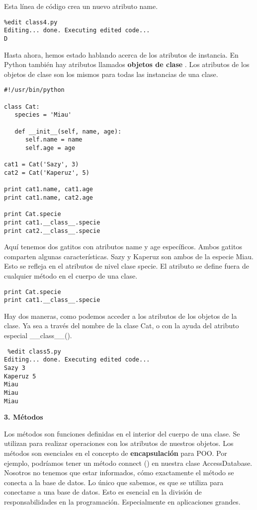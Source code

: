 \documentclass[twoside,10.5pt]{article}%
\begin{document}
Esta l\'inea de c\'odigo crea un nuevo atributo name.

\begin{verbatim}
%edit class4.py
Editing... done. Executing edited code...
D
\end{verbatim}


Hasta ahora, hemos estado hablando acerca de los atributos de instancia. En Python tambi\'en hay atributos llamados \textbf{objetos de clase} . Los atributos de los objetos de clase son los mismos para todas las instancias de una clase.

\vspace{0.3cm}

\begin{verbatim}
#!/usr/bin/python

class Cat:
   species = 'Miau'

   def __init__(self, name, age):
      self.name = name
      self.age = age

cat1 = Cat('Sazy', 3)
cat2 = Cat('Kaperuz', 5)

print cat1.name, cat1.age
print cat1.name, cat2.age

print Cat.specie
print cat1.__class__.specie
print cat2.__class__.specie
\end{verbatim}

Aqu\'i tenemos dos gatitos  con atributos name  y age espec\'ificos. Ambos gatitos comparten algunas caracter\'isticas. Sazy y Kaperuz son ambos de la especie Miau. Esto se refleja en el atributos de nivel clase specie. El atributo se define fuera de cualquier  m\'etodo en el cuerpo de una clase.

\begin{verbatim}
print Cat.specie
print cat1.__class__.specie
\end{verbatim}

Hay dos maneras, como podemos acceder a los atributos de los objetos de la clase. Ya sea a trav\'es del nombre de la clase Cat, o con la ayuda del  atributo especial   {\color{blue}\_\_class\_\_()}.

\begin{verbatim}
 %edit class5.py
Editing... done. Executing edited code...
Sazy 3
Kaperuz 5
Miau
Miau
Miau
\end{verbatim}

\textbf{3. M\'etodos}

Los m\'etodos son funciones definidas en el interior del cuerpo de una clase. Se utilizan para realizar operaciones con los atributos de nuestros objetos. Los m\'etodos son esenciales en el concepto de \textbf{encapsulaci\'on} para POO. Por ejemplo, podr\'iamos tener un m\'etodo  connect () en nuestra clase AccessDatabase. Nosotros no tenemos que estar informados, c\'omo exactamente el m\'etodo  se conecta a la base de datos. Lo \'unico que sabemos, es que se utiliza para conectarse a una base de datos. Esto es esencial en la divisi\'on de responsabilidades en la programaci\'on. Especialmente en aplicaciones grandes.
\end{document}
